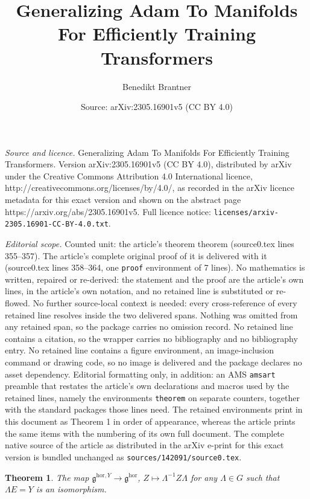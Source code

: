 \documentclass[10pt,a4paper]{amsart}
\title{Generalizing Adam To Manifolds For Efficiently Training Transformers}
\author{Benedikt Brantner}
\date{Source: arXiv:2305.16901v5 (CC BY 4.0)}
\newtheorem{theorem}{Theorem}
\begin{document}
\maketitle

\noindent\emph{Source and licence.} Generalizing Adam To Manifolds For Efficiently Training Transformers. Version arXiv:2305.16901v5 (CC BY 4.0), distributed by arXiv under the Creative Commons Attribution 4.0 International licence, http://creativecommons.org/licenses/by/4.0/, as recorded in the arXiv licence metadata for this exact version and shown on the abstract page https://arxiv.org/abs/2305.16901v5. Full licence notice: \texttt{licenses/arxiv-2305.16901-CC-BY-4.0.txt}.\par\smallskip

\noindent\textit{Editorial scope.} Counted unit: the article's theorem theorem (source0.tex lines 355--357). The article's complete original proof of it is delivered with it (source0.tex lines 358--364, one \texttt{proof} environment of 7 lines). No mathematics is written, repaired or re-derived: the statement and the proof are the article's own lines, in the article's own notation, and no retained line is substituted or re-flowed.  No further source-local context is needed: every cross-reference of every retained line resolves inside the two delivered spans.  Nothing was omitted from any retained span, so the package carries no omission record.  No retained line contains a citation, so the wrapper carries no bibliography and no bibliography entry.  No retained line contains a figure environment, an image-inclusion command or drawing code, so no image is delivered and the package declares no asset dependency.  Editorial formatting only, in addition: an AMS \texttt{amsart} preamble that restates the article's own declarations and macros used by the retained lines, namely the environments \texttt{theorem} on separate counters, together with the standard packages those lines need.  The retained environments print in this document as Theorem 1 in order of appearance, whereas the article prints the same items with the numbering of its own full document.  The complete native source of the article as distributed in the arXiv e-print for this exact version is bundled unchanged as \texttt{sources/142091/source0.tex}.
\begin{theorem}
    The map $\mathfrak{g}^{\mathrm{hor},Y}\to\mathfrak{g}^{\mathrm{hor}}$, $Z\mapsto\Lambda^{-1}Z\Lambda$ for any $\Lambda\in{}G$ such that $\Lambda{}E = Y$ is an isomorphism.
\end{theorem}
\end{document}

